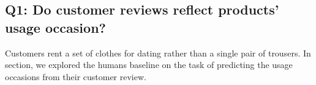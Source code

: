 \documentclass[sigconf]{acmart}
\begin{document}


\subsection{Q1: Do customer reviews reflect products' usage occasion? \label{section:q1}}
Customers rent a set of clothes for dating rather than a single pair of trousers. In section, we explored the humans baseline on the task of predicting the usage occasions from their customer review. 
\end{document}
